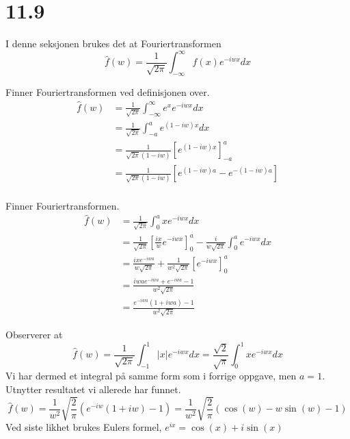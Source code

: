 \documentclass[11pt, a4paper, norsk]{NTNUoving}
\begin{document}
\section*{11.9}
I denne seksjonen brukes det at Fouriertransformen
\[
\hat{f}(w)=\frac{1}{\sqrt{2\pi}}\int_{-\infty}^{\infty}f(x)e^{-iwx} dx
\]
\begin{oppgave}[5]
Finner Fouriertransformen ved definisjonen over.
\begin{align*}
\hat{f}(w)&=\frac{1}{\sqrt{2\pi}}\int_{-\infty}^{\infty}e^x e^{-iwx} dx \\
&=\frac{1}{\sqrt{2\pi}}\int_{-a}^{a}e^{(1-iw)x} dx \\
&=\frac{1}{\sqrt{2\pi}(1-iw)}\left[e^{(1-iw)x}\right]_{-a}^{a} \\
&=\frac{1}{\sqrt{2\pi}(1-iw)}\left[e^{(1-iw)a}-e^{-(1-iw)a}\right] \\
\end{align*}
\end{oppgave}
\begin{oppgave}[7]
Finner Fouriertransformen.
\begin{align*}
\hat{f}(w)&=\frac{1}{\sqrt{2\pi}}\int_{0}^{a}x e^{-iwx} dx \\
&=\frac{1}{\sqrt{2\pi}}\left[\frac{ix}{w}e^{-iwx}\right]_0^a
	 - \frac{i}{w\sqrt{2\pi}}\int_0^a e^{-iwx} dx \\
&=\frac{ixe^{-iwa}}{w\sqrt{2\pi}}
	 + \frac{1}{w^2\sqrt{2\pi}}\left[e^{-iwx}\right]_0^a \\
&=\frac{iwae^{-iwa}+e^{-iwa}-1}{w^2\sqrt{2\pi}} \\
&=\frac{e^{-iwa}(1+iwa)-1}{w^2\sqrt{2\pi}}
\end{align*}
\end{oppgave}
\begin{oppgave}[9]
Observerer at 
\[
\hat{f}(w)=\frac{1}{\sqrt{2\pi}}\int_{-1}^{1}|x| e^{-iwx} dx
	=\frac{\sqrt{2}}{\sqrt{\pi}}\int_{0}^{1}x e^{-iwx} dx 
\]
Vi har dermed et integral på samme form som i forrige oppgave, men $a=1$. Utnytter resultatet vi allerede har funnet.
\[
\hat{f}(w) = \frac{1}{w^2}\sqrt{\frac{2}{\pi}}(e^{-iw}(1+iw)-1)
	 = \frac{1}{w^2}\sqrt{\frac{2}{\pi}}(\cos(w)-w\sin(w)-1)
\]
Ved siste likhet brukes Eulers formel, $e^{ix} = \cos(x)+i\sin(x)$
\end{oppgave}
\end{document}
